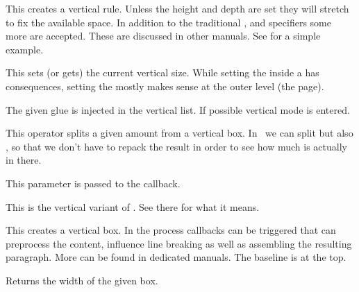 \stopnewprimitive

\startoldprimitive[title={\prm {vrule}}]

This creates a vertical rule. Unless the height and depth are set they will
stretch to fix the available space. In addition to the traditional ,
 and  specifiers some more are accepted. These are
discussed in other manuals. See  for a simple example.

\stopoldprimitive

\startoldprimitive[title={\prm {vsize}}]

This sets (or gets) the current vertical size. While setting the 
inside a  has consequences, setting the  mostly makes
sense at the outer level (the page).

\stopoldprimitive

\startoldprimitive[title={\prm {vskip}}]

The given glue is injected in the vertical list. If possible vertical mode is
entered.

\stopoldprimitive

\startoldprimitive[title={\prm {vsplit}}]

This operator splits a given amount from a vertical box. In \LUAMETATEX\ we can
split  but also , so that we don't have to repack the
result in order to see how much is actually in there.

\stopoldprimitive

\startnewprimitive[title={\prm {vsplitchecks}}]

This parameter is passed to the  callback.

\stopnewprimitive

\startoldprimitive[title={\prm {vss}}]

This is the vertical variant of . See there for what it means.

\stopoldprimitive

\startoldprimitive[title={\prm {vtop}}]

This creates a vertical box. In the process callbacks can be triggered that can
preprocess the content, influence line breaking as well as assembling the
resulting paragraph. More can be found in dedicated manuals. The baseline is
at the top.

\stopoldprimitive

\startoldprimitive[title={\prm {wd}}]

Returns the width of the given box.

